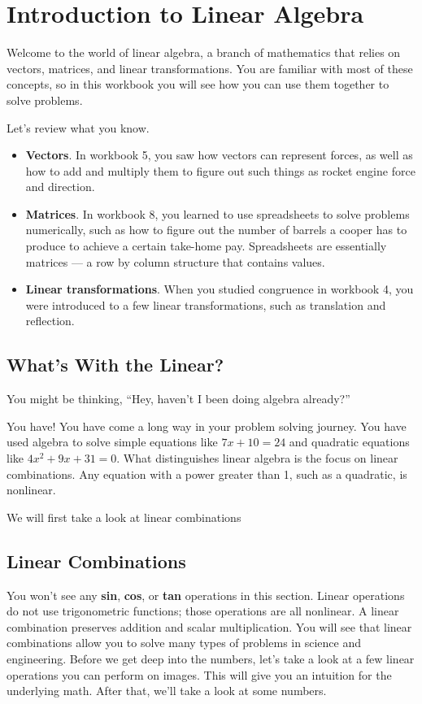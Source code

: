 \chapter{Introduction to Linear Algebra}

Welcome to the world of linear algebra, a branch of mathematics that relies on 
vectors, matrices, and linear transformations. You are familiar with most of 
these concepts, so in this workbook you will see how you can use them together 
to solve problems.  

Let’s review what you know.

\begin{itemize}
\item \textbf{Vectors}. In workbook 5, you saw how vectors can represent 
forces, as well as how to add and multiply them to figure out such things as 
rocket engine force and direction. 
\item \textbf{Matrices}. In workbook 8, you learned to use spreadsheets to 
solve problems numerically, such as how to figure out the number of barrels a 
cooper has to produce to achieve a certain take-home pay. Spreadsheets are 
essentially matrices --- a row by column structure that contains values. 
\item \textbf{Linear transformations}. When you studied congruence in workbook 
4, you were introduced to a few linear transformations, such as translation 
and reflection. 
\end{itemize}

\section{What's With the Linear?}

You might be thinking, “Hey, haven’t I been doing algebra already?” 

You have! You have come a long way in your problem solving journey. You have 
used algebra to solve simple equations like $7x + 10 = 24$ and quadratic 
equations like $4x^{2} + 9x + 31 = 0$. What distinguishes linear algebra is 
the focus on linear combinations. Any equation with a power greater than 1, 
such as a quadratic, is nonlinear.

We will first take a look at linear combinations

\section{Linear Combinations}

You won’t see any \textbf{sin}, \textbf{cos}, or \textbf{tan} operations in 
this section. Linear operations do not use trigonometric functions; those 
operations are all nonlinear. A linear combination  preserves addition and 
scalar multiplication. You will see that linear combinations allow you to 
solve many types of problems in science and engineering. Before we get deep 
into the numbers, let’s take a look at a few linear operations you can perform 
on images. This will give you an intuition for the underlying math. After 
that, we’ll take a look at some numbers.

